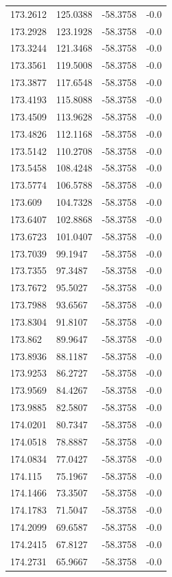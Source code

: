 \begin{table}[H]
\begin{tabular}{llll}
173.2612 & 125.0388 & -58.3758 & -0.0 \\
173.2928 & 123.1928 & -58.3758 & -0.0 \\
173.3244 & 121.3468 & -58.3758 & -0.0 \\
173.3561 & 119.5008 & -58.3758 & -0.0 \\
173.3877 & 117.6548 & -58.3758 & -0.0 \\
173.4193 & 115.8088 & -58.3758 & -0.0 \\
173.4509 & 113.9628 & -58.3758 & -0.0 \\
173.4826 & 112.1168 & -58.3758 & -0.0 \\
173.5142 & 110.2708 & -58.3758 & -0.0 \\
173.5458 & 108.4248 & -58.3758 & -0.0 \\
173.5774 & 106.5788 & -58.3758 & -0.0 \\
173.609 & 104.7328 & -58.3758 & -0.0 \\
173.6407 & 102.8868 & -58.3758 & -0.0 \\
173.6723 & 101.0407 & -58.3758 & -0.0 \\
173.7039 & 99.1947 & -58.3758 & -0.0 \\
173.7355 & 97.3487 & -58.3758 & -0.0 \\
173.7672 & 95.5027 & -58.3758 & -0.0 \\
173.7988 & 93.6567 & -58.3758 & -0.0 \\
173.8304 & 91.8107 & -58.3758 & -0.0 \\
173.862 & 89.9647 & -58.3758 & -0.0 \\
173.8936 & 88.1187 & -58.3758 & -0.0 \\
173.9253 & 86.2727 & -58.3758 & -0.0 \\
173.9569 & 84.4267 & -58.3758 & -0.0 \\
173.9885 & 82.5807 & -58.3758 & -0.0 \\
174.0201 & 80.7347 & -58.3758 & -0.0 \\
174.0518 & 78.8887 & -58.3758 & -0.0 \\
174.0834 & 77.0427 & -58.3758 & -0.0 \\
174.115 & 75.1967 & -58.3758 & -0.0 \\
174.1466 & 73.3507 & -58.3758 & -0.0 \\
174.1783 & 71.5047 & -58.3758 & -0.0 \\
174.2099 & 69.6587 & -58.3758 & -0.0 \\
174.2415 & 67.8127 & -58.3758 & -0.0 \\
174.2731 & 65.9667 & -58.3758 & -0.0 \\

\end{tabular}
\end{table}
